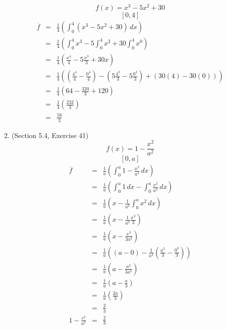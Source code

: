 \documentclass{article}
\begin{document}
\begin{enumerate}
        $$f(x) = x^3 - 5x^2 + 30$$
        $$[0,4]$$
        \begin{eqnarray}
            \overline{f} &=& \frac{1}{4}\left(\int_0^4{\left(x^3 - 5x^2 + 30\right)\,dx}\right) \\
                         &=& \frac{1}{4}\left(\int_0^4{x^3} - 5\int_0^4{x^2} + 30\int_0^4{x^0}\right) \\
                         &=& \frac{1}{4}\left(\frac{x^4}{4} - 5\frac{x^3}{3} + 30x\right) \\
                         &=& \frac{1}{4}\left(\left(\frac{4^4}{4} - \frac{0^4}{4}\right) - \left(5\frac{4^3}{3} - 5\frac{0^3}{3}\right) + \left(30(4) - 30(0)\right)\right) \\
                         &=& \frac{1}{4}\left(64 - \frac{320}{3} + 120\right) \\
                         &=& \frac{1}{4}\left(\frac{232}{3}\right) \\
                         &=& \frac{58}{3}
        \end{eqnarray}
    \item (Section 5.4, Exercise 41)
        $$f(x) = 1 - \frac{x^2}{a^2}$$
        $$[0, a]$$
        \begin{eqnarray}
            \overline{f} &=& \frac{1}{a}\left(\int_0^a{1 - \frac{x^2}{a^2}\,dx}\right) \\
                         &=& \frac{1}{a}\left(\int_0^a{1\,dx} - \int_0^a{\frac{x^2}{a^2}\,dx}\right) \\
                         &=& \frac{1}{a}\left(x - \frac{1}{a^2}\int_0^a{x^2\,dx}\right) \\
                         &=& \frac{1}{a}\left(x - \frac{1}{a^2}\frac{x^3}{3}\right) \\
                         &=& \frac{1}{a}\left(x - \frac{x^3}{3a^2}\right) \\
                         &=& \frac{1}{a}\left(\left(a - 0\right) - \frac{1}{a^2}\left(\frac{a^3}{3} - \frac{0^3}{3}\right)\right) \\
                         &=& \frac{1}{a}\left(a - \frac{a^3}{3a^2}\right) \\
                         &=& \frac{1}{a}\left(a - \frac{a}{3}\right) \\
                         &=& \frac{1}{a}\left(\frac{2a}{3}\right) \\
                         &=& \frac{2}{3} \\
            1 - \frac{c^2}{a^2} &=& \frac{2}{3} \\

\end{eqnarray}
\end{enumerate}
\end{document}
